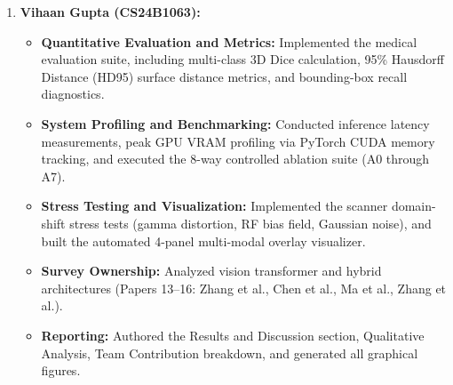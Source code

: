 \documentclass[12pt, a4paper]{article}
\begin{document}
\begin{enumerate}[leftmargin=*, itemsep=10pt]
    \item \textbf{Vihaan Gupta (CS24B1063):}
    \begin{itemize}[leftmargin=*, itemsep=3pt]
        \item \textbf{Quantitative Evaluation and Metrics:} Implemented the medical evaluation suite, including multi-class 3D Dice calculation, 95\% Hausdorff Distance (HD95) surface distance metrics, and bounding-box recall diagnostics.
        \item \textbf{System Profiling and Benchmarking:} Conducted inference latency measurements, peak GPU VRAM profiling via PyTorch CUDA memory tracking, and executed the 8-way controlled ablation suite (A0 through A7).
        \item \textbf{Stress Testing and Visualization:} Implemented the scanner domain-shift stress tests (gamma distortion, RF bias field, Gaussian noise), and built the automated 4-panel multi-modal overlay visualizer.
        \item \textbf{Survey Ownership:} Analyzed vision transformer and hybrid architectures (Papers 13--16: Zhang et al., Chen et al., Ma et al., Zhang et al.).
        \item \textbf{Reporting:} Authored the Results and Discussion section, Qualitative Analysis, Team Contribution breakdown, and generated all graphical figures.
    \end{itemize}
\end{enumerate}

\end{document}
